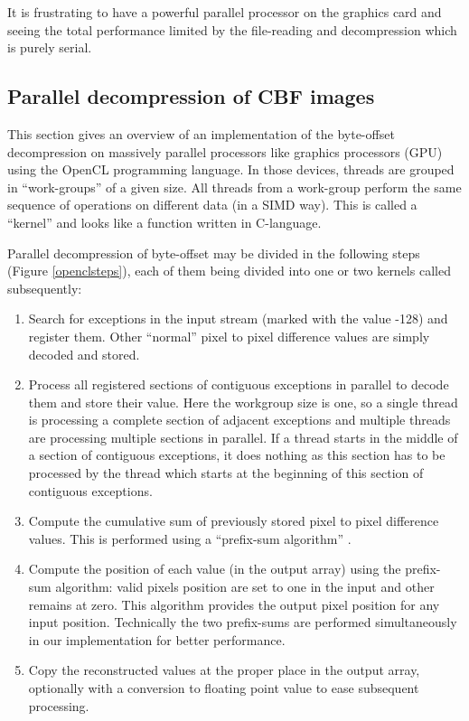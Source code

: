 \documentclass[preprint]{iucr}              %
\begin{document}
It is frustrating to have a powerful parallel processor on the
graphics card and seeing the total performance limited by the file-reading
 and decompression which is purely serial.

\subsection{Parallel decompression of CBF images}
 
This section gives an overview of an implementation of the byte-offset
decompression on massively parallel processors like graphics processors
(GPU) using the OpenCL \cite{opencl} programming language.
In those devices, threads are grouped in ``work-groups'' of a given size.
All threads from a work-group perform the same sequence of operations on
different data (in a SIMD way).
This is called a ``kernel'' and looks like a function written in C-language.

Parallel decompression of byte-offset may be divided in the following steps (Figure \ref{openclsteps}),
each of them being divided into one or two kernels called subsequently:
\begin{enumerate}
  \item Search for exceptions in the input stream (marked with the value -128)
  and register them. Other ``normal'' pixel to pixel difference values are simply decoded and stored.
  \item Process all registered sections of contiguous exceptions in parallel to decode them and store their value.
  Here the workgroup size is one, so a single thread is processing a complete
  section of adjacent exceptions and multiple threads are processing multiple
  sections in parallel.
  If a thread starts in the middle of a section of contiguous exceptions,
  it does nothing as this section has to be processed by the thread
  which starts at the beginning of this section of contiguous exceptions.
  \item Compute the cumulative sum of previously stored pixel to pixel difference values.
  This is performed using a ``prefix-sum algorithm'' \cite{scan}.
  \item Compute the position of each value (in the output array)
  using the prefix-sum algorithm: valid pixels position are set to one in the
  input and other remains at zero. This algorithm provides the output pixel
  position for any input position.
  Technically the two prefix-sums are performed simultaneously in our
  implementation for better performance.
  \item Copy the reconstructed values at the proper place in
  the output array, optionally with a conversion to floating point value to
  ease subsequent processing.
\end{enumerate}
\end{document}
